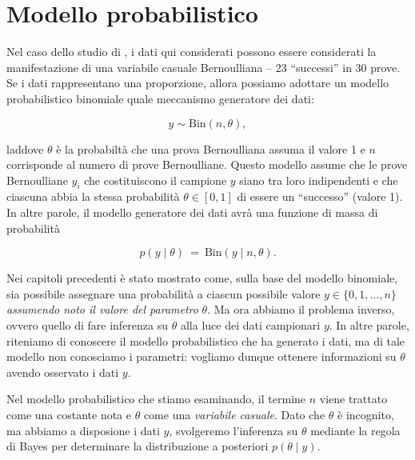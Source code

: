 \documentclass[
  11pt,
]{krantz}
\theoremstyle{definition}
\theoremstyle{definition}
\theoremstyle{definition}
\theoremstyle{definition}
\theoremstyle{remark}
\begin{document}
\hypertarget{modello-probabilistico}{%
\section{Modello probabilistico}\label{modello-probabilistico}}

Nel caso dello studio di \citet{zetschefuture2019}, i dati qui considerati possono essere considerati la manifestazione di una variabile casuale Bernoulliana -- 23 ``successi'' in 30 prove. Se i dati rappresentano una proporzione, allora possiamo adottare un modello probabilistico binomiale quale meccanismo generatore dei dati:

\begin{equation}
y  \sim \mbox{Bin}(n, \theta),
\label{eq:binomialmodel}
\end{equation}

laddove \(\theta\) è la probabiltà che una prova Bernoulliana assuma il valore 1 e \(n\) corrisponde al numero di prove Bernoulliane. Questo modello assume che le prove Bernoulliane \(y_i\) che costituiscono il campione \(y\) siano tra loro indipendenti e che ciascuna abbia la stessa probabilità \(\theta \in [0, 1]\) di essere un ``successo'' (valore 1). In altre parole, il modello generatore dei dati avrà una funzione di massa di probabilità

\[
p(y \mid \theta)
\ = \
\mbox{Bin}(y \mid n, \theta).
\]

Nei capitoli precedenti è stato mostrato come, sulla base del modello binomiale, sia possibile assegnare una probabilità a ciascun possibile valore \(y \in \{0, 1, \dots, n\}\) \emph{assumendo noto il valore del parametro} \(\theta\). Ma ora abbiamo il problema inverso, ovvero quello di fare inferenza su \(\theta\) alla luce dei dati campionari \(y\). In altre parole, riteniamo di conoscere il modello probabilistico che ha generato i dati, ma di tale modello non conosciamo i parametri: vogliamo dunque ottenere informazioni su \(\theta\) avendo osservato i dati \(y\).

Nel modello probabilistico che stiamo esaminando, il termine \(n\) viene trattato come una costante nota e \(\theta\) come una \emph{variabile casuale}. Dato che \(\theta\) è incognito, ma abbiamo a disposione i dati \(y\), svolgeremo l'inferenza su \(\theta\) mediante la regola di Bayes per determinare la distribuzione a posteriori \(p(\theta \mid y)\).
\end{document}
